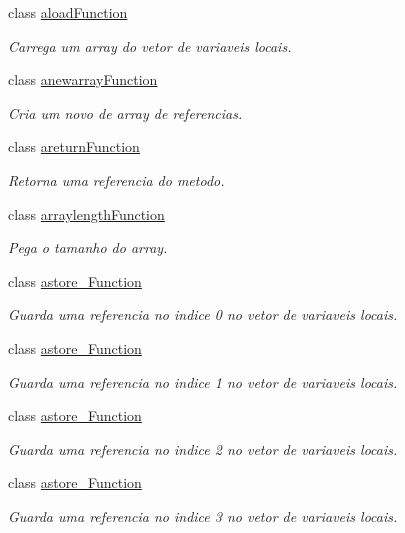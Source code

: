 \begin{DoxyCompactItemize}
class \hyperlink{classInstruction_1_1aloadFunction}{aload\+Function}
\begin{DoxyCompactList}\small\item\em Carrega um array do vetor de variaveis locais. \end{DoxyCompactList}\item 
class \hyperlink{classInstruction_1_1anewarrayFunction}{anewarray\+Function}
\begin{DoxyCompactList}\small\item\em Cria um novo de array de referencias. \end{DoxyCompactList}\item 
class \hyperlink{classInstruction_1_1areturnFunction}{areturn\+Function}
\begin{DoxyCompactList}\small\item\em Retorna uma referencia do metodo. \end{DoxyCompactList}\item 
class \hyperlink{classInstruction_1_1arraylengthFunction}{arraylength\+Function}
\begin{DoxyCompactList}\small\item\em Pega o tamanho do array. \end{DoxyCompactList}\item 
class \hyperlink{classInstruction_1_1astore__0Function}{astore\+\_\+Function}
\begin{DoxyCompactList}\small\item\em Guarda uma referencia no indice 0 no vetor de variaveis locais. \end{DoxyCompactList}\item 
class \hyperlink{classInstruction_1_1astore__1Function}{astore\+\_\+Function}
\begin{DoxyCompactList}\small\item\em Guarda uma referencia no indice 1 no vetor de variaveis locais. \end{DoxyCompactList}\item 
class \hyperlink{classInstruction_1_1astore__2Function}{astore\+\_\+Function}
\begin{DoxyCompactList}\small\item\em Guarda uma referencia no indice 2 no vetor de variaveis locais. \end{DoxyCompactList}\item 
class \hyperlink{classInstruction_1_1astore__3Function}{astore\+\_\+Function}
\begin{DoxyCompactList}\small\item\em Guarda uma referencia no indice 3 no vetor de variaveis locais. \end{DoxyCompactList}\item 

\end{DoxyCompactItemize}
